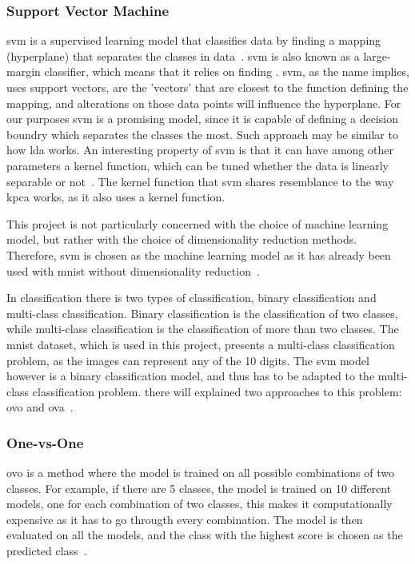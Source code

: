 \subsubsection{Support Vector Machine}\label{subsubsec:support-vector-machine}
\gls{svm} is a supervised learning model that classifies data by finding a mapping (hyperplane) that separates the classes in data~\cite{faster-svm}. \gls{svm} is also known as a large-margin classifier, which means that it relies on finding . \gls{svm}, as the name implies, uses support vectors, are the 'vectors' that are closest to the function defining the mapping, and alterations on those data points will influence the hyperplane. For our purposes \gls{svm} is a promising model, since it is capable of defining a decision boundry which separates the classes the most. Such approach may be similar to how \gls{lda} works. An interesting property of \gls{svm} is that it can have among other parameters a kernel function, which can be tuned whether the data is linearly separable or not~\cite{faster-svm}. The kernel function that \gls{svm} shares resemblance to the way \gls{kpca} works, as it also uses a kernel function.

This project is not particularly concerned with the choice of machine learning model, but rather with the choice of dimensionality reduction methods. Therefore, \gls{svm} is chosen as the machine learning model as it has already been used with \gls{mnist} without dimensionality reduction~\cite{lecun-mnist-database}. 

In classification there is two types of classification, binary classification and multi-class classification. Binary classification is the classification of two classes, while multi-class classification is the classification of more than two classes. The \gls{mnist} dataset, which is used in this project, presents a multi-class classification problem, as the images can represent any of the 10 digits. The \gls{svm} model however is a binary classification model, and thus has to be adapted to the multi-class classification problem. there will explained two approaches to this problem: \gls{ovo} and \gls{ova}~\cite{james-statistical-learning}.
\subsubsection{One-vs-One}\label{subsubsec:one-vs-one}
\gls{ovo} is a method where the model is trained on all possible combinations of two classes. For example, if there are 5 classes, the model is trained on 10 different models, one for each combination of two classes, this makes it computationally expensive as it has to go througth every combination. The model is then evaluated on all the models, and the class with the highest score is chosen as the predicted class~\cite{james-statistical-learning}.
